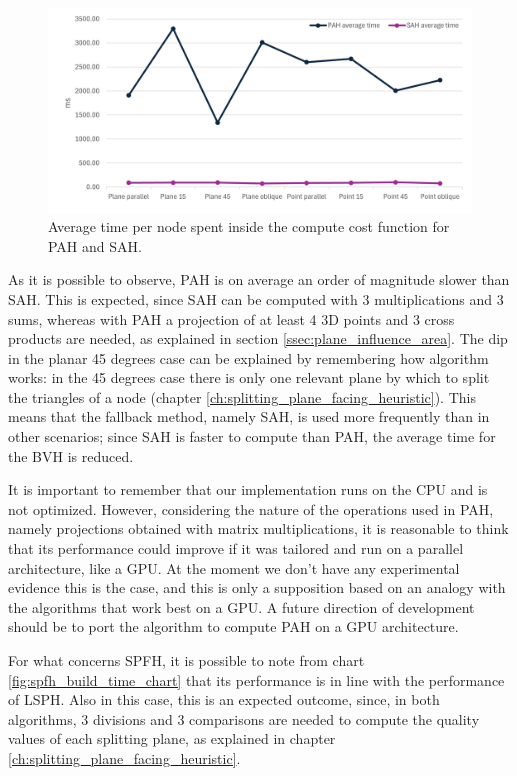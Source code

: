 \documentclass{PoliMi_MasterThesis}
\begin{document}
\begin{figure}[H] 
	\centering
	\includegraphics[width=\textwidth]{Images/pah_build_time_chart.png}
	\caption{Average time per node spent inside the compute cost function for PAH and SAH.}
	\label{fig:pah_build_time_chart}
\end{figure}

As it is possible to observe, PAH is on average an order of magnitude slower than SAH. This is expected, since SAH can be computed with 3 multiplications and 3 sums, whereas with PAH a projection of at least 4 3D points and 3 cross products are needed, as explained in section \ref{ssec:plane_influence_area}. The dip in the planar 45 degrees case can be explained by remembering how algorithm works: in the 45 degrees case there is only one relevant plane by which to split the triangles of a node (chapter \ref{ch:splitting_plane_facing_heuristic}). This means that the fallback method, namely SAH, is used more frequently than in other scenarios; since SAH is faster to compute than PAH, the average time for the BVH is reduced.

It is important to remember that our implementation runs on the CPU and is not optimized. However, considering the nature of the operations used in PAH, namely projections obtained with matrix multiplications, it is reasonable to think that its performance could improve if it was tailored and run on a parallel architecture, like a GPU. At the moment we don't have any experimental evidence this is the case, and this is only a supposition based on an analogy with the algorithms that work best on a GPU. A future direction of development should be to port the algorithm to compute PAH on a GPU architecture.

For what concerns SPFH, it is possible to note from chart \ref{fig:spfh_build_time_chart} that its performance is in line with the performance of LSPH. Also in this case, this is an expected outcome, since, in both algorithms, 3 divisions and 3 comparisons are needed to compute the quality values of each splitting plane, as explained in chapter \ref{ch:splitting_plane_facing_heuristic}.
\end{document}
